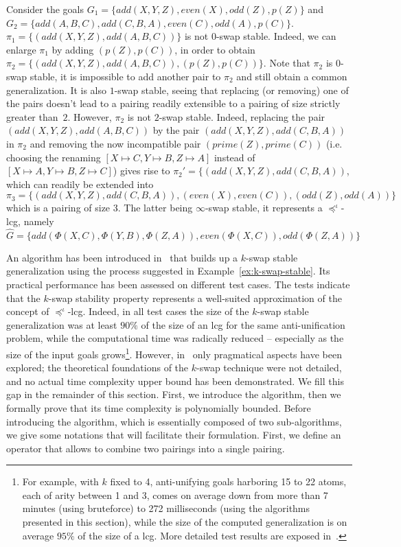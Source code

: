 \begin{example}\label{ex:k-swap-stable}
   	Consider the goals $G_1 = \{add(X,Y,Z), even(X), odd(Z), p(Z)\}$ and $
G_2 = \{add(A,B,C), add(C,B,A), even(C), odd(A), p(C)\}$. 
   	 $\pi_1= \{(add(X,Y,Z), add(A,B,C))\}$ is not $0$-swap stable. Indeed, we can enlarge $\pi_1$ by adding $(p(Z),p(C))$, in order to obtain 
   	$\pi_2 = \{(add(X,Y,Z),add(A,B,C)), (p(Z),p(C))\}.$
   	Note that $\pi_2$ is $0$-swap stable, it is impossible to add another pair to $\pi_2$ and still obtain a common generalization. 
   	It is also $1$-swap stable, seeing that replacing (or removing) one of the pairs doesn't lead to a pairing readily extensible to a pairing of size strictly greater than~$2$. However, $\pi_2$ is not $2$-swap stable. Indeed, replacing the pair $(add(X,Y,Z),add(A,B,C))$ by the pair $(add(X,Y,Z), add(C,B,A))$ in $\pi_2$ and removing the now incompatible pair $(prime(Z),prime(C))$ (i.e. choosing the renaming $[X\mapsto C, Y\mapsto B, Z\mapsto A]$ instead of $[X\mapsto A, Y\mapsto B, Z\mapsto C]$) gives rise to $\pi_2' = \{(add(X,Y,Z),add(C,B,A))$, which can readily be extended into
   	   		$\pi_3 = \{(add(X,Y,Z),add(C,B,A)), (even(X),even(C)), (odd(Z),odd(A))\}$
   	which is a pairing of size 3. The latter being $\infty$-swap stable, it represents a $\preceq^\iota$-lcg, namely
   		$\hat{G} = \{add(\Phi(X,C), \Phi(Y,B), \Phi(Z,A)), even(\Phi(X,C)), odd(\Phi(Z,A))\}$
\end{example}
An algorithm has been introduced in~\cite{gen} that builds up a $k$-swap stable generalization using the process suggested in Example~\ref{ex:k-swap-stable}. Its practical performance has been assessed on different test cases. The tests indicate that the $k$-swap stability property represents a well-suited approximation of the concept of $\preceq^\iota$-lcg. Indeed, in all test cases the size of the $k$-swap stable generalization was at least $90\%$ of the size of an lcg for the same anti-unification problem, while the computational time was radically reduced -- especially as the size of the input goals grows\footnote{For example, with $k$ fixed to 4, anti-unifying goals harboring 15 to 22 atoms, each of arity between 1 and 3, comes on average down from more than 7 minutes (using bruteforce) to 272 milliseconds (using the algorithms presented in this section), while the size of the computed generalization is on average $95\%$ of the size of a lcg. More detailed test results are exposed in~\cite{gen}.}. However, in~\cite{gen} only pragmatical aspects have been explored; the theoretical foundations of the $k$-swap technique were not detailed, and  no actual time complexity upper bound has been demonstrated. We fill this gap in the remainder of this section. First, we introduce the algorithm, then we formally prove that its time complexity is polynomially bounded. Before introducing the algorithm, which is essentially composed of two sub-algorithms, we give some notations that will facilitate their formulation. First, we define an operator that allows to combine two pairings into a single pairing.
	
